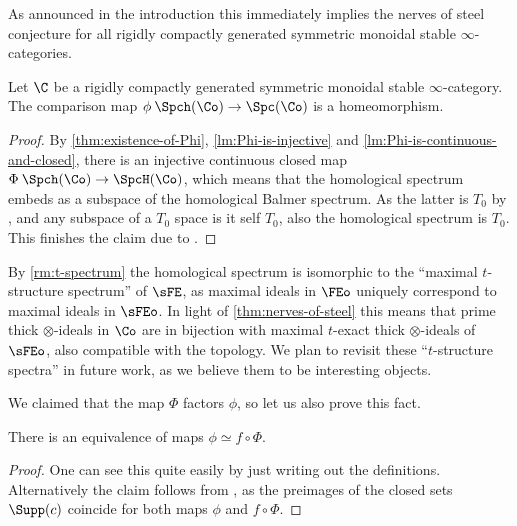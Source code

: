 As announced in the introduction this immediately implies the nerves of steel conjecture for all rigidly compactly generated symmetric monoidal stable $\infty$-categories. 

\begin{theorem}
    \label{thm:nerves-of-steel}
    Let $\C$ be a rigidly compactly generated symmetric monoidal stable $\infty$-category. The comparison map $\phi\: \Spch(\Co)\to \Spc(\Co)$ is a homeomorphism.  
\end{theorem}
\begin{proof}
    By \cref{thm:existence-of-Phi}, \cref{lm:Phi-is-injective} and \cref{lm:Phi-is-continuous-and-closed}, there is an injective continuous closed map $\Phi\: \Spch(\Co)\to \SpcH(\Co)$, which means that the homological spectrum embeds as a subspace of the homological Balmer spectrum. As the latter is $T_0$ by \cite[2.9]{balmer_2005}, and any subspace of a $T_0$ space is it self $T_0$, also the homological spectrum is $T_0$. This finishes the claim due to \cite[4.5]{barthel_heard_sanders_2022}.
\end{proof}

\begin{remark}
    By \cref{rm:t-spectrum} the homological spectrum is isomorphic to the ``maximal $t$-structure spectrum'' of $\sFE$, as maximal ideals in $\FEo$ uniquely correspond to maximal ideals in $\sFEo$. In light of \cref{thm:nerves-of-steel} this means that prime thick $\otimes$-ideals in $\Co$ are in bijection with maximal $t$-exact thick $\otimes$-ideals of $\sFEo$, also compatible with the topology. We plan to revisit these ``$t$-structure spectra'' in future work, as we believe them to be interesting objects. 
\end{remark}


We claimed that the map $\Phi$ factors $\phi$, so let us also prove this fact. 

\begin{proposition}
    \label{prop:Phi-factors-phi}
    There is an equivalence of maps $\phi \simeq f\circ \Phi$. 
\end{proposition}
\begin{proof}
    One can see this quite easily by just writing out the definitions. Alternatively the claim follows from \cite[3.3]{balmer_2005}, as the preimages of the closed sets $\Supp(c)$ coincide for both maps $\phi$ and $f\circ \Phi$. 
\end{proof}















